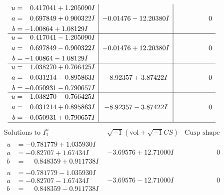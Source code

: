 \documentclass[1p]{elsarticle_modified}
\theoremstyle{definition}
\newcommand{\I}{\sqrt{-1}}
\begin{document}
$$\begin{array}{c|c|c}
\begin{aligned}
u &= \phantom{-}0.417041 + 1.205090 I \\
a &= \phantom{-}0.697849 + 0.900322 I \\
b &= -1.00864 + 1.08129 I\end{aligned}
 & -0.01476 - 12.20380 I & \phantom{-0.000000 } 0 \\ \hline\begin{aligned}
u &= \phantom{-}0.417041 - 1.205090 I \\
a &= \phantom{-}0.697849 - 0.900322 I \\
b &= -1.00864 - 1.08129 I\end{aligned}
 & -0.01476 + 12.20380 I & \phantom{-0.000000 } 0 \\ \hline\begin{aligned}
u &= \phantom{-}1.038270 + 0.766425 I \\
a &= \phantom{-}0.031214 - 0.895863 I \\
b &= -0.050931 - 0.790657 I\end{aligned}
 & -8.92357 + 3.87422 I & \phantom{-0.000000 } 0 \\ \hline\begin{aligned}
u &= \phantom{-}1.038270 - 0.766425 I \\
a &= \phantom{-}0.031214 + 0.895863 I \\
b &= -0.050931 + 0.790657 I\end{aligned}
 & -8.92357 - 3.87422 I & \phantom{-0.000000 } 0\\
 \hline 
 \end{array}$$\newpage$$\begin{array}{c|c|c}  
\text{Solutions to }I^u_{1}& \I (\text{vol} + \sqrt{-1}CS) & \text{Cusp shape}\\
 \hline 
\begin{aligned}
u &= -0.781779 + 1.035930 I \\
a &= -0.82707 + 1.67434 I \\
b &= \phantom{-}0.848359 + 0.911738 I\end{aligned}
 & -3.69576 + 12.71000 I & \phantom{-0.000000 } 0 \\ \hline\begin{aligned}
u &= -0.781779 - 1.035930 I \\
a &= -0.82707 - 1.67434 I \\
b &= \phantom{-}0.848359 - 0.911738 I\end{aligned}
 & -3.69576 - 12.71000 I & \phantom{-0.000000 } 0 \\ \hline\begin{aligned}

\end{aligned}
\end{array}$$
\end{document}
